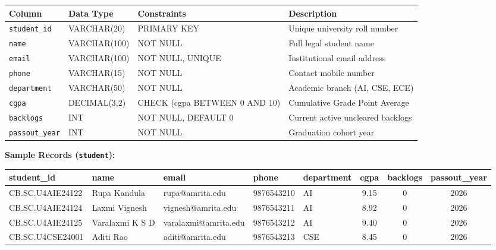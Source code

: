 \documentclass[11pt,a4paper]{article}
\begin{document}
\begin{table}[H]
    \centering
    \footnotesize
    \begin{tabularx}{\textwidth}{l l l X}
        \toprule
        \textbf{Column} & \textbf{Data Type} & \textbf{Constraints} & \textbf{Description} \\
        \midrule
        \texttt{student\_id} & VARCHAR(20) & PRIMARY KEY & Unique university roll number \\
        \texttt{name} & VARCHAR(100) & NOT NULL & Full legal student name \\
        \texttt{email} & VARCHAR(100) & NOT NULL, UNIQUE & Institutional email address \\
        \texttt{phone} & VARCHAR(15) & NOT NULL & Contact mobile number \\
        \texttt{department} & VARCHAR(50) & NOT NULL & Academic branch (AI, CSE, ECE) \\
        \texttt{cgpa} & DECIMAL(3,2) & CHECK (cgpa BETWEEN 0 AND 10) & Cumulative Grade Point Average \\
        \texttt{backlogs} & INT & NOT NULL, DEFAULT 0 & Current active uncleared backlogs \\
        \texttt{passout\_year} & INT & NOT NULL & Graduation cohort year \\
        \bottomrule
    \end{tabularx}
\end{table}

\textbf{Sample Records (\texttt{student}):}
\begin{table}[H]
    \centering
    \scriptsize
    \begin{tabularx}{\textwidth}{l l l l l c c c}
        \toprule
        \textbf{student\_id} & \textbf{name} & \textbf{email} & \textbf{phone} & \textbf{department} & \textbf{cgpa} & \textbf{backlogs} & \textbf{passout\_year} \\
        \midrule
        CB.SC.U4AIE24122 & Rupa Kandula & rupa@amrita.edu & 9876543210 & AI & 9.15 & 0 & 2026 \\
        CB.SC.U4AIE24124 & Laxmi Vignesh & vignesh@amrita.edu & 9876543211 & AI & 8.92 & 0 & 2026 \\
        CB.SC.U4AIE24125 & Varalaxmi K S D & varalaxmi@amrita.edu & 9876543212 & AI & 9.40 & 0 & 2026 \\
        CB.SC.U4CSE24001 & Aditi Rao & aditi@amrita.edu & 9876543213 & CSE & 8.45 & 0 & 2026 \\
        \bottomrule
    \end{tabularx}
\end{table}
\end{document}
